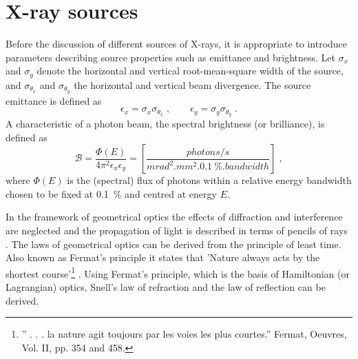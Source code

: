 \documentclass[
twoside,
openright,
titlepage,
numbers=noenddot,
headinclude,
fleqn,
a4paper,
footinclude=true,
cleardoublepage=empty,
abstractoff,
BCOR=5mm,
paper=a4,
fontsize=11pt,
british,ngerman,american,
]{scrreprt}
\begin{document}
\section{X-ray sources}
\label{sec:sources}

Before the discussion of different sources of X-rays, it is
appropriate to introduce parameters describing  source properties
such as emittance and brightness.  Let $\sigma_{x}$ and $\sigma_{y}$
denote the horizontal and vertical root-mean-square width of the
source, and $\sigma_{\theta_x}$ and $\sigma_{\theta_y}$ the horizontal
and vertical beam divergence.  The source emittance is defined as
\begin{equation}
  \label{eq:emit}
  \epsilon_x = \sigma_x\sigma_{\theta_x}\;,
  \qquad\epsilon_y = \sigma_y\sigma_{\theta_y}\;.
\end{equation}
A characteristic of a photon beam, the spectral brightness (or
brilliance), is defined as
\begin{equation}
  \label{eq:bright}
  \mathcal{B} = \frac{\Phi(E)}{4\pi^2\epsilon_x\epsilon_y}
  =\left[\frac{\si{photons/s}}{\si{mrad^2.mm^2.}
      \SI{0.1}{\percent.bandwidth}}\right]\;,
\end{equation}
where $\Phi(E)$ is the (spectral) flux of photons within a relative
energy bandwidth chosen to be fixed at \SI{0.1}{\percent} and centred
at energy $E$.

In the framework of geometrical optics the effects of diffraction and
interference are neglected and the propagation of light is described
in terms of pencils of rays \cite{BornWolf}.  The laws of geometrical
optics can be derived from the principle of least time.  Also known as
Fermat's principle it states that 'Nature always acts by the shortest
course'\footnote{'' . . . la nature agit toujours par les voies les
  plus courtes.''  Fermat, Oeuvres, Vol. II, pp. 354 and 458.}
\cite{BornWolf}.  Using Fermat's principle, which is the basis of
Hamiltonian (or Lagrangian) optics, Snell's law of refraction and the
law of reflection can be derived.
\end{document}

